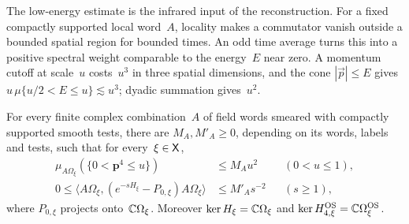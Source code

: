 The low-energy estimate is the infrared input of the reconstruction. For a fixed compactly supported local word~$A$, locality makes a commutator vanish outside a bounded spatial region for bounded times. An odd time average turns this into a positive spectral weight comparable to the energy~$E$ near zero. A momentum cutoff at scale~$u$ costs~$u^3$ in three spatial dimensions, and the cone $|\vec p|\le E$ gives $u\,\mu\{u/2<E\le u\}\lesssim u^3$; dyadic summation gives~$u^2$.
\begin{lemma}\label{lem:H2.3}
For every finite complex combination~$A$ of field words smeared with compactly supported smooth tests, there are $M_A,M'_A\ge0$, depending on its words, labels and tests, such that for every~$\xi\in\mathsf{X}$,
\begin{align*}
\mu_{A\Omega_\xi}(\{0<\mathbf p^4\le u\})&\le M_Au^2&&(0<u\le1),\\
0\le\langle A\Omega_\xi,(e^{-sH_\xi}-P_{0,\xi})A\Omega_\xi\rangle&\le M'_As^{-2}&&(s\ge1),
\end{align*}
where $P_{0,\xi}$ projects onto~$\mathbb{C}\Omega_\xi$. Moreover $\ker H_\xi=\mathbb{C}\Omega_\xi$ and $\ker H_{4,\xi}^{\rm OS}=\mathbb{C}\Omega_\xi^{\rm OS}$.
\end{lemma}
